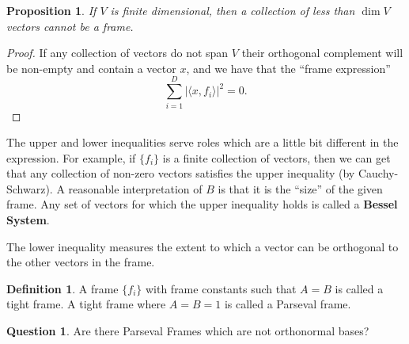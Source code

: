 \documentclass[12pt]{article}
\theoremstyle{plain}
\newtheorem{prop}{Proposition}
\theoremstyle{definition}
\newtheorem{defn}{Definition}
\newtheorem{question}{Question}
\begin{document}
\begin{prop}
If $V$ is finite dimensional, then a collection of less than $\dim{V}$ vectors cannot be a frame.
\end{prop}
\begin{proof}
If any collection of vectors do not span $V$ their orthogonal complement will be non-empty and contain a vector $x$, and we have that the ``frame expression''
\[\sum_{i = 1}^D|\langle x, f_i\rangle|^2 = 0.\]
\end{proof}

The upper and lower inequalities serve roles which are a little bit different in the expression.
For example, if $\{f_i\}$ is a finite collection of vectors, then we can get that any collection of non-zero vectors satisfies the upper inequality (by Cauchy-Schwarz). A reasonable interpretation of $B$ is that it is the ``size'' of the given frame. Any set of vectors for which the upper inequality holds is called a \textbf{Bessel System}.

The lower inequality measures the extent to which a vector can be orthogonal to the other vectors in the frame.

\begin{defn}
	A frame $\{f_i\}$ with frame constants such that $A = B$ is called a tight frame. A tight frame where $A = B = 1$ is called a Parseval frame.
\end{defn}

\begin{question}
Are there Parseval Frames which are not orthonormal bases?
\end{question}
\end{document}

